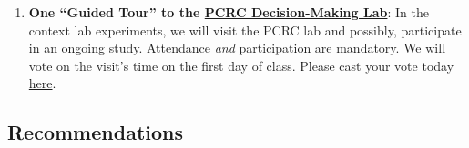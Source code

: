 \documentclass[letterpaper]{article}
\begin{document}
\begin{enumerate}
\item {\bf One ``Guided Tour'' to the \href{https://pcrclab.utu.fi/?page_id=894&lang=en}{PCRC Decision-Making Lab}}: In the context lab experiments, we will visit the PCRC lab and possibly, participate in an ongoing study. Attendance \emph{and} participation are mandatory. We will vote on the visit's time on the first day of class. Please cast your vote today \href{https://doodle.com/meeting/participate/id/dLnyLoXa}{here}. %

  


\end{enumerate}



\subsection*{Recommendations}
\end{document}

